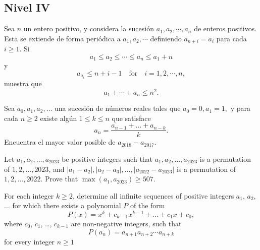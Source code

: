 \documentclass[11pt]{scrartcl}
\begin{document}
\subsection{Nivel IV}

\begin{problem}
    Sea $n$ un entero positivo, y considera la sucesión $a_1 , a_2 , \cdots , a_n $ de enteros positivos. Esta se extiende de forma periódica a $a_1 , a_2 , \cdots $ definiendo $a_{n+i} = a_i $ para cada $i \ge 1$. Si\[a_1 \le a_2 \le \cdots \le a_n \le a_1 +n  \]y \[a_{a_i } \le n+i-1 \quad\text{for}\quad i=1,2,\cdots, n, \]muestra que\[a_1 + \cdots +a_n \le n^2. \]
\end{problem}

\begin{problem}
    Sea $a_0,a_1,a_2,\dots $ una sucesión de números reales tales que $a_0=0, a_1=1,$ y para cada $n\geq 2$ existe algún $1 \leq k \leq n$ que satisface\[ a_n=\frac{a_{n-1}+\dots + a_{n-k}}{k}. \]Encuentra el mayor valor posible de $a_{2018}-a_{2017}$.
\end{problem}

\begin{problem}
    Let $a_1,a_2,\dots,a_{2023}$ be positive integers such that
$a_1,a_2,\dots,a_{2023}$ is a permutation of $1,2,\dots,2023$, and
$|a_1-a_2|,|a_2-a_3|,\dots,|a_{2022}-a_{2023}|$ is a permutation of $1,2,\dots,2022$.
Prove that $\max(a_1,a_{2023})\ge 507$.
\end{problem}

\begin{problem}
    For each integer $k\geq 2$, determine all infinite sequences of positive integers $a_1$, $a_2$, $\ldots$ for which there exists a polynomial $P$ of the form\[ P(x)=x^k+c_{k-1}x^{k-1}+\dots + c_1 x+c_0, \]where $c_0$, $c_1$, \dots, $c_{k-1}$ are non-negative integers, such that\[ P(a_n)=a_{n+1}a_{n+2}\cdots a_{n+k} \]for every integer $n\geq 1$
\end{problem}
\end{document}
